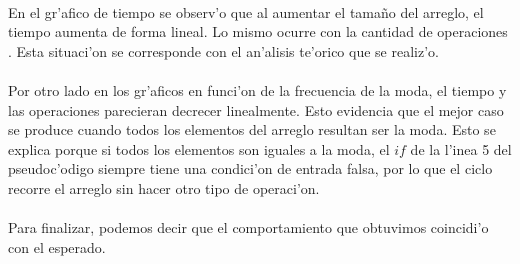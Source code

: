 \paragraph{}
En el gr'afico de tiempo se observ'o que al aumentar el tama\~{n}o del arreglo, el tiempo 
aumenta de forma lineal. Lo mismo ocurre con la cantidad de operaciones . Esta situaci'on se 
corresponde con el an'alisis te'orico que se realiz'o. 
\paragraph{}
Por otro lado en los gr'aficos en funci'on 
de la frecuencia de la moda, el tiempo y las operaciones parecieran decrecer linealmente. Esto 
evidencia que el mejor caso se produce cuando todos los elementos del arreglo resultan ser la moda. Esto se
explica porque si todos los elementos son iguales a la moda, el $if$ de la l'inea 5 del pseudoc'odigo
siempre tiene una condici'on de entrada falsa, por lo que el ciclo recorre el arreglo sin 
hacer otro tipo de operaci'on. 
\paragraph{}
Para finalizar, podemos decir que el comportamiento que obtuvimos coincidi'o con el esperado.
